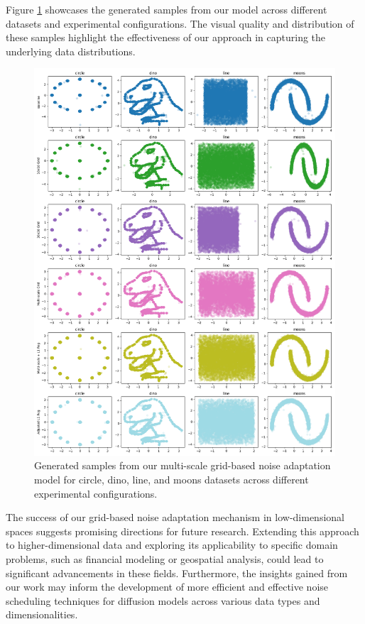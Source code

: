 \documentclass{article} %
\begin{document}
Figure \ref{fig:generated_images} showcases the generated samples from our model across different datasets and experimental configurations. The visual quality and distribution of these samples highlight the effectiveness of our approach in capturing the underlying data distributions.

\begin{figure}[t]
    \centering
    \includegraphics[width=\textwidth]{generated_images.png}
    \caption{Generated samples from our multi-scale grid-based noise adaptation model for circle, dino, line, and moons datasets across different experimental configurations.}
    \label{fig:generated_images}
\end{figure}

The success of our grid-based noise adaptation mechanism in low-dimensional spaces suggests promising directions for future research. Extending this approach to higher-dimensional data and exploring its applicability to specific domain problems, such as financial modeling or geospatial analysis, could lead to significant advancements in these fields. Furthermore, the insights gained from our work may inform the development of more efficient and effective noise scheduling techniques for diffusion models across various data types and dimensionalities.
\end{document}
